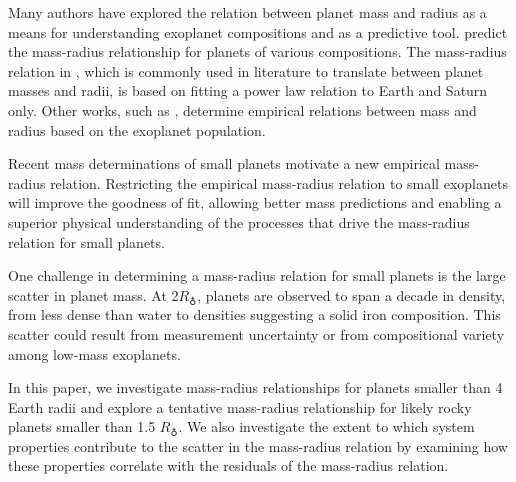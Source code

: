 \documentclass[iop]{emulateapj}
\newcommand{\rearth}{\ensuremath{R_\earth}}
\begin{document}
Many authors have explored the relation between planet mass and radius as a means for understanding exoplanet compositions and as a predictive tool.  \citet{Seager2007} predict the mass-radius relationship for  planets of various compositions.  The mass-radius relation in \citet{Lissauer2011}, which is commonly used in literature to translate between planet masses and radii, is based on fitting a power law relation to Earth and Saturn only.  Other works, such as \citet{Enoch2012, Kane2012, Weiss2013}, determine empirical relations between mass and radius based on the exoplanet population.  

Recent mass determinations of small planets motivate a new empirical mass-radius relation.  Restricting the empirical mass-radius relation to small exoplanets will improve the goodness of fit, allowing better mass predictions and enabling a superior physical understanding of the processes that drive the mass-radius relation for small planets.  

One challenge in determining a mass-radius relation for small planets is the large scatter in planet mass.  At 2\rearth, planets are observed to span a decade in density, from less dense than water to densities suggesting a solid iron composition.  This scatter could result from measurement uncertainty or from compositional variety among low-mass exoplanets.

In this paper, we investigate mass-radius relationships for planets smaller than 4 Earth radii and explore a tentative mass-radius relationship for likely rocky planets smaller than 1.5 \rearth.  We also investigate the extent to which system properties contribute to the scatter in the mass-radius relation by examining how these properties correlate with the residuals of the mass-radius relation.

\end{document}
